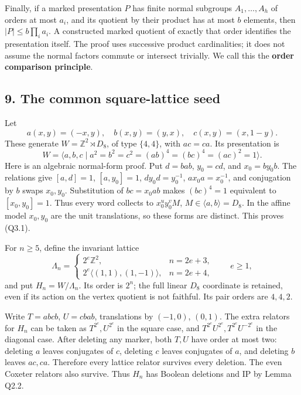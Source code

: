 \documentclass[
  10pt,
  letterpaper,
]{article}
\begin{document}
Finally, if a marked presentation \(P\) has finite normal subgroups
\(A_1,\ldots,A_h\) of orders at most \(a_i\), and its quotient by their
product has at most \(b\) elements, then \(|P|\le b\prod_i a_i\). A
constructed marked quotient of exactly that order identifies the
presentation itself. The proof uses successive product cardinalities; it
does not assume the normal factors commute or intersect trivially. We
call this the \textbf{order comparison principle}.

\subsection{9. The common square-lattice
seed}\label{the-common-square-lattice-seed}

Let \[
 a(x,y)=(-x,y),\quad b(x,y)=(y,x),\quad c(x,y)=(x,1-y).
\] These generate \(W=\mathbb Z^2\rtimes D_8\), of type \(\{4,4\}\),
with \(ac=ca\). Its presentation is \[
 W=\langle a,b,c\mid a^2=b^2=c^2=(ab)^4=(bc)^4=(ac)^2=1\rangle. \tag{Q3.1}
\] Here is an algebraic normal-form proof. Put \(d=bab\), \(y_0=cd\),
and \(x_0=by_0b\). The relations give \([a,d]=1\), \([a,y_0]=1\),
\(dy_0d=y_0^{-1}\), \(ax_0a=x_0^{-1}\), and conjugation by \(b\) swaps
\(x_0,y_0\). Substitution of \(bc=x_0ab\) makes \((bc)^4=1\) equivalent
to \([x_0,y_0]=1\). Thus every word collects to \(x_0^u y_0^v M\),
\(M\in\langle a,b\rangle=D_8\). In the affine model \(x_0,y_0\) are the
unit translations, so these forms are distinct. This proves (Q3.1).

For \(n\ge5\), define the invariant lattice \[
 \Lambda_n=\begin{cases}
  2^e\mathbb Z^2,&n=2e+3,\\
  2^e\langle(1,1),(1,-1)\rangle,&n=2e+4,
 \end{cases}\qquad e\ge1,
\] and put \(H_n=W/\Lambda_n\). Its order is \(2^n\); the full linear
\(D_8\) coordinate is retained, even if its action on the vertex
quotient is not faithful. Its pair orders are \(4,4,2\).

Write \(T=abcb\), \(U=cbab\), translations by \((-1,0)\), \((0,1)\). The
extra relators for \(H_n\) can be taken as \(T^{2^e},U^{2^e}\) in the
square case, and \(T^{2^e}U^{2^e},T^{2^e}U^{-2^e}\) in the diagonal
case. After deleting any marker, both \(T,U\) have order at most two:
deleting \(a\) leaves conjugates of \(c\), deleting \(c\) leaves
conjugates of \(a\), and deleting \(b\) leaves \(ac,ca\). Therefore
every lattice relator survives every deletion. The even Coxeter relators
also survive. Thus \(H_n\) has Boolean deletions and IP by Lemma Q2.2.
\end{document}

